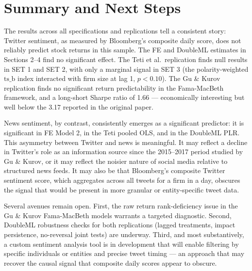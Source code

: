 \documentclass[12pt]{article}
\begin{document}
\newpage
\section{Summary and Next Steps}

The results across all specifications and replications tell a consistent story: Twitter sentiment, as measured by Bloomberg's composite daily score, does not reliably predict stock returns in this sample. The FE and DoubleML estimates in Sections 2--4 find no significant effect. The Teti et al.\ replication finds null results in SET 1 and SET 2, with only a marginal signal in SET 3 (the polarity-weighted $\text{ts\_b}$ index interacted with firm size at lag 1, $p < 0.10$). The Gu \& Kurov replication finds no significant return predictability in the Fama-MacBeth framework, and a long-short Sharpe ratio of 1.66 --- economically interesting but well below the 3.17 reported in the original paper.

News sentiment, by contrast, consistently emerges as a significant predictor: it is significant in FE Model 2, in the Teti pooled OLS, and in the DoubleML PLR. This asymmetry between Twitter and news is meaningful. It may reflect a decline in Twitter's role as an information source since the 2015--2017 period studied by Gu \& Kurov, or it may reflect the noisier nature of social media relative to structured news feeds. It may also be that Bloomberg's composite Twitter sentiment score, which aggregates across all tweets for a firm in a day, obscures the signal that would be present in more granular or entity-specific tweet data.

Several avenues remain open. First, the raw return rank-deficiency issue in the Gu \& Kurov Fama-MacBeth models warrants a targeted diagnostic. Second, DoubleML robustness checks for both replications (lagged treatments, impact persistence, no-reversal joint tests) are underway. Third, and most substantively, a custom sentiment analysis tool is in development that will enable filtering by specific individuals or entities and precise tweet timing --- an approach that may recover the causal signal that composite daily scores appear to obscure.
\end{document}
